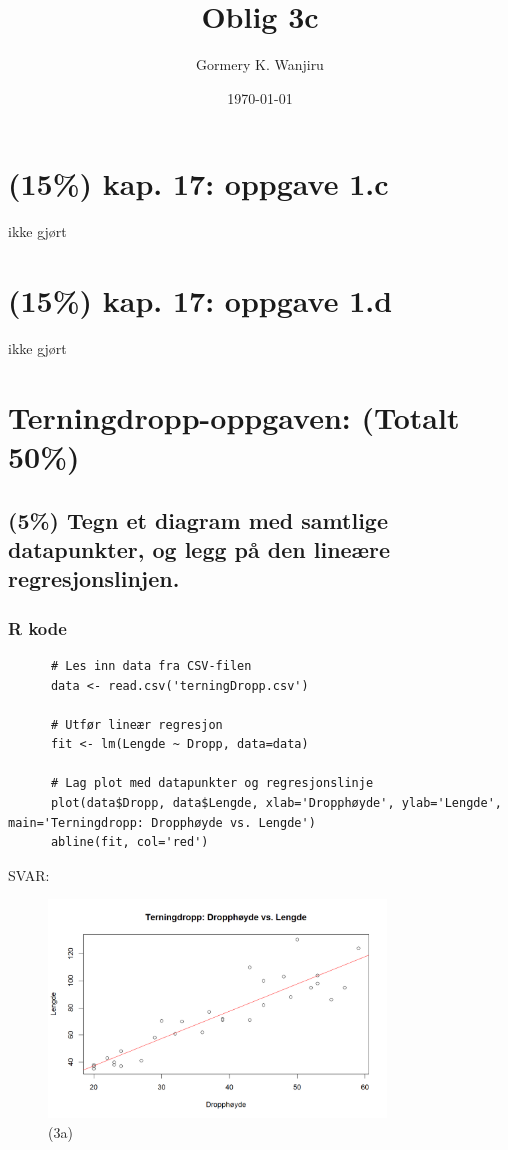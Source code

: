 \documentclass[12pt]{article}
\title{Oblig 3c}
\author{Gormery K. Wanjiru}
\date{\today}
\begin{document}
\maketitle

\newpage
\tableofcontents

\newpage

\section{(15\%) kap. 17: oppgave 1.c}
ikke gjørt

\section{(15\%) kap. 17: oppgave 1.d}
ikke gjørt
\section{Terningdropp-oppgaven: (Totalt 50\%)}
\subsection{(5\%) Tegn et diagram med samtlige datapunkter, og legg på den lineære regresjonslinjen.}
\subsubsection{R kode}
\begin{verbatim}
      # Les inn data fra CSV-filen
      data <- read.csv('terningDropp.csv')
      
      # Utfør lineær regresjon
      fit <- lm(Lengde ~ Dropp, data=data)
      
      # Lag plot med datapunkter og regresjonslinje
      plot(data$Dropp, data$Lengde, xlab='Dropphøyde', ylab='Lengde', main='Terningdropp: Dropphøyde vs. Lengde')
      abline(fit, col='red')  
    \end{verbatim}
SVAR:
\begin{figure}[H]
  \centering
  \includegraphics[width=0.8\textwidth]{3a.png}
  \caption{(3a)}
\end{figure}
\end{document}
